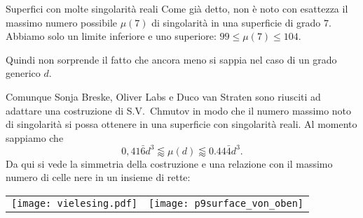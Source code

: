 \begin{surferPage}[216 Singularities]{Superfici con molte singolarit\`a reali}
    Come gi\`a detto, non \`e noto con esattezza il massimo numero possibile 
    $\mu(7)$ di singolarit\`a in una superficie di grado $7$.
    Abbiamo solo un limite inferiore e uno superiore: $99\le \mu(7) \le 104$. 

    Quindi non sorprende il fatto che ancora meno si sappia nel caso di un grado generico $d$. 

    Comunque Sonja Breske, Oliver Labs e Duco van Straten sono riusciti ad adattare una costruzione di S.V.\ Chmutov in modo che il numero massimo noto di singolarit\`a si possa ottenere in una superficie con singolarit\`a reali.
    Al momento sappiamo che
    \[0,41\bar{6}d^3 \lessapprox \mu(d) \lessapprox 0.44\bar{4} d^3.\]
     Da qui si vede la simmetria della costruzione e una relazione con il massimo numero di celle nere in un insieme di rette:
    \begin{center}
      \begin{tabular}{c@{\qquad}c}
        \texttt{[image: vielesing.pdf]}
        &
        \texttt{[image: p9surface\_von\_oben]}
      \end{tabular}
    \end{center}
\end{surferPage}
